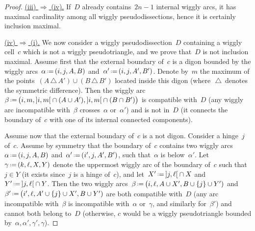 \documentclass{amsart}
\theoremstyle{definition}
\newcommand{\symdif}{\,\triangle\,} %
\newcommand{\eqdef}{\mbox{\,\raisebox{0.2ex}{\scriptsize\ensuremath{\mathrm:}}\ensuremath{=}\,}} %
\newcommand{\ie}{\textit{i.e.}~} %
\newcommand{\para}[1]{\smallskip\noindent\uline{#1.}} %
\begin{document}
\begin{proof}
%

\para{(iii) $\Rightarrow$ (iv)}
If~$D$ already contains~$2n-1$ internal wiggly arcs, it has maximal cardinality among all wiggly pseudodissections, hence it is certainly inclusion maximal.

\para{(iv) $\Rightarrow$ (i)}
We now consider a wiggly pseudodissection~$D$ containing a wiggly cell~$c$ which is not a wiggly pseudotriangle, and we prove that~$D$ is not inclusion maximal.
%
Assume first that the external boundary of~$c$ is a digon bounded by the wiggly arcs~$\alpha \eqdef (i, j, A, B)$ and~$\alpha' \eqdef (i, j, A', B')$.
Denote by~$m$ the maximum of the points~$(A \symdif A') \cup (B \symdif B')$ located inside this digon (where~$\symdif$ denotes the symmetric difference).
Then the wiggly arc~$\beta \eqdef \big( i, m, {]i,m[} \cap (A \cup A'), {]i,m[} \cap (B \cap B') \big)$ is compatible with~$D$ (any wiggly arc incompatible with~$\beta$ crosses~$\alpha$ or~$\alpha'$) and is not in~$D$ (it connects the boundary of~$c$ with one of its internal connected components).

Assume now that the external boundary of~$c$ is a not digon.
Consider a hinge~$j$ of~$c$.
Assume by symmetry that the boundary of~$c$ contains two wiggly arcs~$\alpha \eqdef (i, j, A, B)$ and~$\alpha' \eqdef (i', j, A', B')$, such that~$\alpha$ is below~$\alpha'$. %
Let~$\gamma \eqdef (k, \ell, X, Y)$ denote the uppermost wiggly arc of the boundary of~$c$ such that~$j \in Y$ (it exists since~$j$ is a  hinge of~$c$), and let~$X' \eqdef {]j,\ell[} \cap X$ and~$Y' \eqdef {]j,\ell[} \cap Y$.
Then the two wiggly arcs~$\beta \eqdef \big( i, \ell, A \cup X', B \cup \{j\} \cup Y')$ and~$\beta' \eqdef \big( i', \ell, A'  \cup \{j\} \cup X', B \cup Y')$ are both compatible with~$D$ (any arc incompatible with~$\beta$ is incompatible with~$\alpha$ or~$\gamma$, and similarly for~$\beta'$) and cannot both belong to~$D$ (otherwise, $c$ would be a wiggly pseudotriangle bounded by~$\alpha, \alpha', \gamma', \gamma$).
\end{proof}
\end{document}
